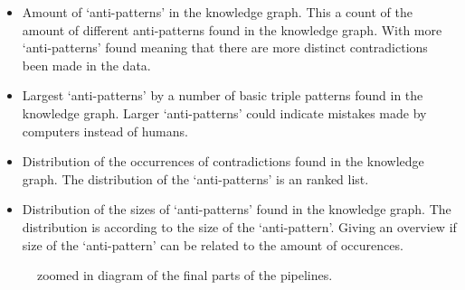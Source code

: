 \documentclass[11pt,letterpaper ,oneside ]{book}
\begin{document}
	\begin{itemize}
		\item Amount of `anti-patterns' in the knowledge graph. This a count of the amount of different anti-patterns found in the knowledge graph. With more `anti-patterns' found meaning that there are more distinct contradictions been made in the data.
		\item Largest `anti-patterns' by a number of basic triple patterns found in the knowledge graph. Larger `anti-patterns' could indicate mistakes made by computers instead of humans.
		\item Distribution of the occurrences of contradictions found in the knowledge graph. The distribution of the `anti-patterns' is an ranked list. 
		\item Distribution of the sizes of `anti-patterns' found in the knowledge graph. The distribution is according to the size of the `anti-pattern'. Giving an overview if size of the `anti-pattern' can be related to the amount of occurences.
	\end{itemize} 
	\begin{figure}[!t]
	\caption{zoomed in diagram of the final parts of the pipelines.}
	\label{fig:PipelinePart45}
\end{figure}
	
\end{document}
